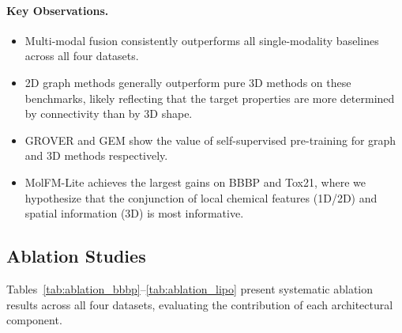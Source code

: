 \documentclass[11pt]{article}
\newcommand{\modelname}{MolFM-Lite}
\begin{document}
\paragraph{Key Observations.}
\begin{itemize}[leftmargin=*,itemsep=2pt]
    \item Multi-modal fusion consistently outperforms all single-modality baselines across all four datasets.
    \item 2D graph methods generally outperform pure 3D methods on these benchmarks, likely reflecting that the target properties are more determined by connectivity than by 3D shape.
    \item GROVER and GEM show the value of self-supervised pre-training for graph and 3D methods respectively.
    \item \modelname{} achieves the largest gains on BBBP and Tox21, where we hypothesize that the conjunction of local chemical features (1D/2D) and spatial information (3D) is most informative.
\end{itemize}

\subsection{Ablation Studies}
\label{sec:ablation}

Tables~\ref{tab:ablation_bbbp}--\ref{tab:ablation_lipo} present systematic ablation results across all four datasets, evaluating the contribution of each architectural component.
\end{document}
